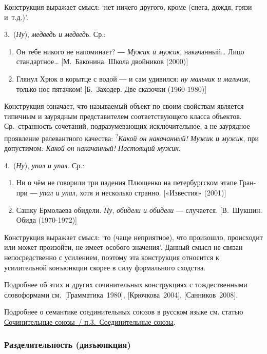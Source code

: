 Конструкция выражает смысл: `нет ничего другого, кроме (снега, дождя,
грязи и~т.д.)'.

3.~(\textit{Ну}), \textit{медведь и медведь}. Ср.:

\begin{enumerate}
\def\labelenumi{(\arabic{enumi})}
\setcounter{enumi}{166}
\item
  Он тебе никого не напоминает? ― \textit{Мужик и мужик},
  накачанный\ldots{} Лицо стандартное\ldots{} {[}М.~Баконина. Школа
  двойников (2000){]}
\item
  Глянул Хрюк в корытце с водой ― и сам удивился: \textit{ну мальчик и
  мальчик}, только нос пятачком! {[}Б.~Заходер. Две сказочки
  (1960-1980){]}
\end{enumerate}

Конструкция означает, что называемый объект по своим свойствам является
типичным и заурядным представителем соответствующего класса объектов.
Ср.~странность сочетаний, подразумевающих исключительное, а не заурядное
проявление релевантного качества: \textsuperscript{?}\textit{Какой он
накачанный! Мужик и мужик}, при допустимом: \textit{Какой он накачанный!
Настоящий мужик}.

4.~(\textit{Ну}), \textit{упал и упал}. Ср.:

\begin{enumerate}
\def\labelenumi{(\arabic{enumi})}
\setcounter{enumi}{168}
\item
  Ни о чём не говорили три падения Плющенко на петербургском этапе
  Гран-при ― \textit{упал и упал}, хотя и несколько странно. {[}«Известия»
  (2001){]}
\item
  Сашку Ермолаева обидели. \textit{Ну}, \textit{обидели и обидели} ―
  случается. {[}В.~Шукшин. Обида (1970-1972){]}
\end{enumerate}

Конструкция выражает смысл: `то (чаще неприятное), что произошло,
происходит или может произойти, не имеет особого значения'. Данный смысл
не связан непосредственно с усилением, поэтому эта конструкция относится
к усилительной конъюнкции скорее в силу формального сходства.

Подробнее об этих и других сочинительных конструкциях с тождественными
словоформами см.~{[}Грамматика~1980{]}, {[}Крючкова~2004{]},
{[}Санников~2008{]}.

Подробнее о семантике соединительных союзов в русском языке см. статью
\underline{Сочинительные союзы~/ п.3.~Соединительные союзы}.

\subsubsection{Разделительность
(дизъюнкция)}\label{ux440ux430ux437ux434ux435ux43bux438ux442ux435ux43bux44cux43dux43eux441ux442ux44c-ux434ux438ux437ux44aux44eux43dux43aux446ux438ux44f}


